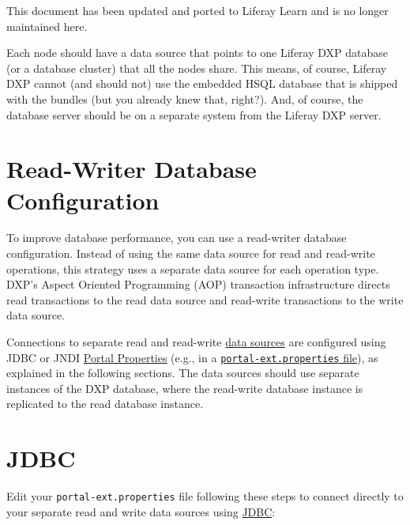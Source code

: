 {This document has been updated and ported to Liferay Learn and is no
longer maintained here.}

Each node should have a data source that points to one Liferay DXP
database (or a database cluster) that all the nodes share. This means,
of course, Liferay DXP cannot (and should not) use the embedded HSQL
database that is shipped with the bundles (but you already knew that,
right?). And, of course, the database server should be on a separate
system from the Liferay DXP server.

\section{Read-Writer Database
Configuration}\label{read-writer-database-configuration}

To improve database performance, you can use a read-writer database
configuration. Instead of using the same data source for read and
read-write operations, this strategy uses a separate data source for
each operation type. DXP's Aspect Oriented Programming (AOP) transaction
infrastructure directs read transactions to the read data source and
read-write transactions to the write data source.

Connections to separate read and read-write
\href{https://docs.liferay.com/portal/7.2-latest/propertiesdoc/portal.properties.html\#JDBC}{data
sources} are configured using JDBC or JNDI
\href{/docs/7-2/deploy/-/knowledge_base/d/portal-properties}{Portal
Properties} (e.g., in a
\href{/docs/7-2/deploy/-/knowledge_base/d/portal-properties}{\texttt{portal-ext.properties}
file}), as explained in the following sections. The data sources should
use separate instances of the DXP database, where the read-write
database instance is replicated to the read database instance.

\section{JDBC}\label{jdbc}

Edit your \texttt{portal-ext.properties} file following these steps to
connect directly to your separate read and write data sources using
\href{/docs/7-2/deploy/-/knowledge_base/d/database-templates}{JDBC}:

